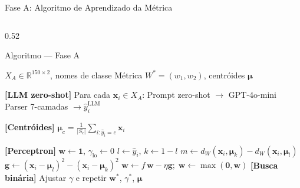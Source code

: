 \documentclass[aspectratio=169, 8pt]{beamer}
\newcommand{\norm}[1]{\left\lVert#1\right\rVert}
\begin{document}
\begin{frame}{Fase A: Algoritmo de Aprendizado da Métrica}
  \begin{columns}[T]
    \begin{column}{0.52\textwidth}
      \begin{block}{Algoritmo --- Fase A}
        \begin{algorithmic}[1]
          \scriptsize
          \Require $X_A \in \mathbb{R}^{150 \times 2}$, nomes de classe
          \Ensure Métrica $W^* = (w_1, w_2)$, centróides $\boldsymbol{\mu}$

          \State \textbf{[LLM zero-shot]} Para cada $\mathbf{x}_i \in X_A$:
          \State \quad Prompt zero-shot $\rightarrow$ GPT-4o-mini
          \State \quad Parser 7-camadas $\rightarrow \hat{y}_i^{\text{LLM}}$

          \State \textbf{[Centróides]} $\boldsymbol{\mu}_c = \tfrac{1}{|S_c|}\sum_{i:\hat{y}_i=c}\mathbf{x}_i$

          \State \textbf{[Perceptron]} $\mathbf{w} \leftarrow \mathbf{1}$,
          $\gamma_{\text{lo}} \leftarrow 0$
          \Repeat
              \State $l \leftarrow \hat{y}_i$, $k \leftarrow 1-l$
              \State $m \leftarrow d_W(\mathbf{x}_i,\boldsymbol{\mu}_k) - d_W(\mathbf{x}_i,\boldsymbol{\mu}_l)$
              \If{$m < \gamma\norm{\mathbf{w}}$}
                \State $\mathbf{g} \leftarrow (\mathbf{x}_i{-}\boldsymbol{\mu}_l)^2 - (\mathbf{x}_i{-}\boldsymbol{\mu}_k)^2$
                \State $\mathbf{w} \leftarrow f\,\mathbf{w} - \eta\mathbf{g};\;
                  \mathbf{w} \leftarrow \max(\mathbf{0},\mathbf{w})$
              \EndIf
            \EndFor
          \State \textbf{[Busca binária]} Ajustar $\gamma$ e repetir
          \State \Return $\mathbf{w}^*$, $\gamma^*$, $\boldsymbol{\mu}$
        \end{algorithmic}
      \end{block}
    \end{column}

  \end{columns}
\end{frame}
\end{document}
